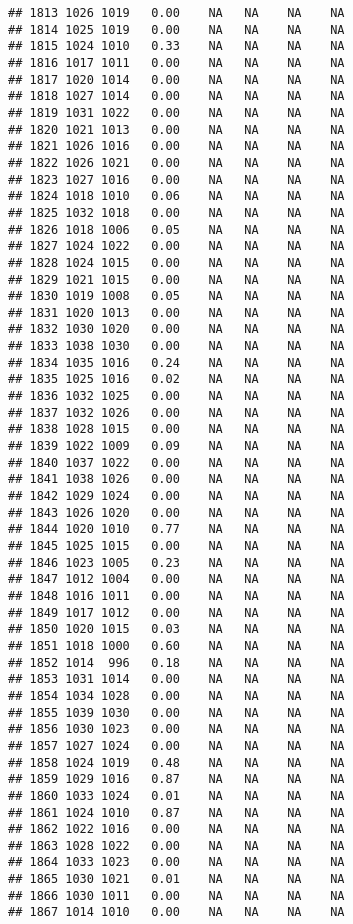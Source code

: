 \documentclass{article}\usepackage{graphicx, color}
\makeatletter
\newenvironment{kframe}{%
 \def\at@end@of@kframe{}%
 \ifinner\ifhmode%
  \def\at@end@of@kframe{\end{minipage}}%
  \begin{minipage}{\columnwidth}%
 \fi\fi%
 \def\FrameCommand##1{\hskip\@totalleftmargin \hskip-\fboxsep
 \colorbox{shadecolor}{##1}\hskip-\fboxsep
     \hskip-\linewidth \hskip-\@totalleftmargin \hskip\columnwidth}%
 \MakeFramed {\advance\hsize-\width
   \@totalleftmargin\z@ \linewidth\hsize
   \@setminipage}}%
 {\par\unskip\endMakeFramed%
 \at@end@of@kframe}
\newenvironment{knitrout}{}{} %
\makeatother
\begin{document}
\begin{knitrout}
\begin{kframe}
\begin{verbatim}
## 1813 1026 1019   0.00    NA   NA    NA    NA
## 1814 1025 1019   0.00    NA   NA    NA    NA
## 1815 1024 1010   0.33    NA   NA    NA    NA
## 1816 1017 1011   0.00    NA   NA    NA    NA
## 1817 1020 1014   0.00    NA   NA    NA    NA
## 1818 1027 1014   0.00    NA   NA    NA    NA
## 1819 1031 1022   0.00    NA   NA    NA    NA
## 1820 1021 1013   0.00    NA   NA    NA    NA
## 1821 1026 1016   0.00    NA   NA    NA    NA
## 1822 1026 1021   0.00    NA   NA    NA    NA
## 1823 1027 1016   0.00    NA   NA    NA    NA
## 1824 1018 1010   0.06    NA   NA    NA    NA
## 1825 1032 1018   0.00    NA   NA    NA    NA
## 1826 1018 1006   0.05    NA   NA    NA    NA
## 1827 1024 1022   0.00    NA   NA    NA    NA
## 1828 1024 1015   0.00    NA   NA    NA    NA
## 1829 1021 1015   0.00    NA   NA    NA    NA
## 1830 1019 1008   0.05    NA   NA    NA    NA
## 1831 1020 1013   0.00    NA   NA    NA    NA
## 1832 1030 1020   0.00    NA   NA    NA    NA
## 1833 1038 1030   0.00    NA   NA    NA    NA
## 1834 1035 1016   0.24    NA   NA    NA    NA
## 1835 1025 1016   0.02    NA   NA    NA    NA
## 1836 1032 1025   0.00    NA   NA    NA    NA
## 1837 1032 1026   0.00    NA   NA    NA    NA
## 1838 1028 1015   0.00    NA   NA    NA    NA
## 1839 1022 1009   0.09    NA   NA    NA    NA
## 1840 1037 1022   0.00    NA   NA    NA    NA
## 1841 1038 1026   0.00    NA   NA    NA    NA
## 1842 1029 1024   0.00    NA   NA    NA    NA
## 1843 1026 1020   0.00    NA   NA    NA    NA
## 1844 1020 1010   0.77    NA   NA    NA    NA
## 1845 1025 1015   0.00    NA   NA    NA    NA
## 1846 1023 1005   0.23    NA   NA    NA    NA
## 1847 1012 1004   0.00    NA   NA    NA    NA
## 1848 1016 1011   0.00    NA   NA    NA    NA
## 1849 1017 1012   0.00    NA   NA    NA    NA
## 1850 1020 1015   0.03    NA   NA    NA    NA
## 1851 1018 1000   0.60    NA   NA    NA    NA
## 1852 1014  996   0.18    NA   NA    NA    NA
## 1853 1031 1014   0.00    NA   NA    NA    NA
## 1854 1034 1028   0.00    NA   NA    NA    NA
## 1855 1039 1030   0.00    NA   NA    NA    NA
## 1856 1030 1023   0.00    NA   NA    NA    NA
## 1857 1027 1024   0.00    NA   NA    NA    NA
## 1858 1024 1019   0.48    NA   NA    NA    NA
## 1859 1029 1016   0.87    NA   NA    NA    NA
## 1860 1033 1024   0.01    NA   NA    NA    NA
## 1861 1024 1010   0.87    NA   NA    NA    NA
## 1862 1022 1016   0.00    NA   NA    NA    NA
## 1863 1028 1022   0.00    NA   NA    NA    NA
## 1864 1033 1023   0.00    NA   NA    NA    NA
## 1865 1030 1021   0.01    NA   NA    NA    NA
## 1866 1030 1011   0.00    NA   NA    NA    NA
## 1867 1014 1010   0.00    NA   NA    NA    NA

\end{verbatim}
\end{kframe}
\end{knitrout}
\end{document}
